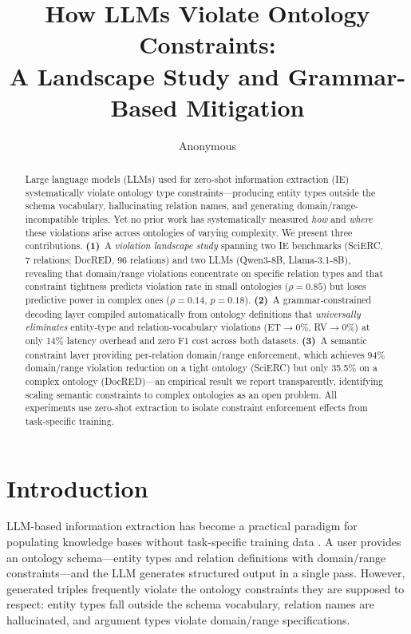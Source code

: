 \documentclass[11pt,a4paper]{article}
\title{How LLMs Violate Ontology Constraints:\\A Landscape Study and Grammar-Based Mitigation}
\author{Anonymous}
\date{}
\begin{document}
\maketitle

\begin{abstract}
Large language models (LLMs) used for zero-shot information extraction (IE) systematically violate ontology type constraints---producing entity types outside the schema vocabulary, hallucinating relation names, and generating domain/range-incompatible triples.
Yet no prior work has systematically measured \emph{how} and \emph{where} these violations arise across ontologies of varying complexity.
We present three contributions.
\textbf{(1)}~A \emph{violation landscape study} spanning two IE benchmarks (SciERC, 7 relations; DocRED, 96 relations) and two LLMs (Qwen3-8B, Llama-3.1-8B), revealing that domain/range violations concentrate on specific relation types and that constraint tightness predicts violation rate in small ontologies ($\rho{=}0.85$) but loses predictive power in complex ones ($\rho{=}0.14$, $p{=}0.18$).
\textbf{(2)}~A grammar-constrained decoding layer compiled automatically from ontology definitions that \emph{universally eliminates} entity-type and relation-vocabulary violations (ET${\to}$0\%, RV${\to}$0\%) at only 14\% latency overhead and zero F1 cost across both datasets.
\textbf{(3)}~A semantic constraint layer providing per-relation domain/range enforcement, which achieves 94\% domain/range violation reduction on a tight ontology (SciERC) but only 35.5\% on a complex ontology (DocRED)---an empirical result we report transparently, identifying scaling semantic constraints to complex ontologies as an open problem.
All experiments use zero-shot extraction to isolate constraint enforcement effects from task-specific training.
\end{abstract}

\section{Introduction}
\label{sec:intro}

LLM-based information extraction has become a practical paradigm for populating knowledge bases without task-specific training data \citep{wei2023zeroshot}.
A user provides an ontology schema---entity types and relation definitions with domain/range constraints---and the LLM generates structured output in a single pass.
However, generated triples frequently violate the ontology constraints they are supposed to respect: entity types fall outside the schema vocabulary, relation names are hallucinated, and argument types violate domain/range specifications.
\end{document}
